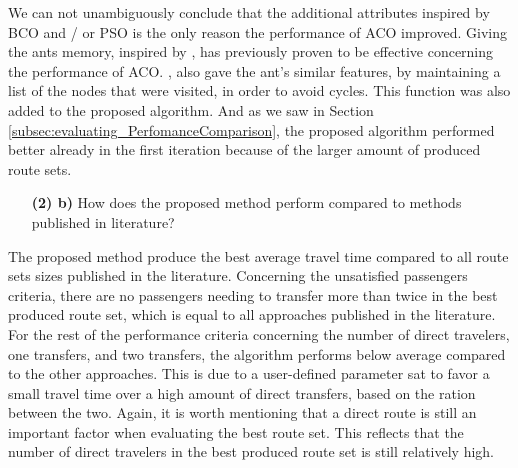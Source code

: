 We can not unambiguously conclude that the additional attributes inspired by BCO and / or PSO is the only reason the performance of ACO improved. Giving the ants memory, inspired by \citet{dorigo96}, has previously proven to be effective concerning the performance of ACO. \citet{sedighpour14}, \citet{poorzahedy11} \citet{salehinejad10} also gave the ant's similar features, by maintaining a list of the nodes that were visited, in order to avoid cycles. This function was also added to the proposed algorithm. And as we saw in Section \vref{subsec:evaluating_PerfomanceComparison}, the proposed algorithm performed better already in the first iteration because of the larger amount of produced route sets.

\begin{itemize}
\item[\textbf{(2) b)}] How does the proposed method perform compared to methods published in literature?
\end{itemize}

The proposed method produce the best average travel time compared to all route sets sizes published in the literature. Concerning the unsatisfied passengers criteria, there are no passengers needing to transfer more than twice in the best produced route set, which is equal to all approaches published in the literature. For the rest of the performance criteria concerning the number of direct travelers, one transfers, and two transfers, the algorithm performs below average compared to the other approaches. This is due to a user-defined parameter sat to favor a small travel time over a high amount of direct transfers, based on the ration between the two. Again, it is worth mentioning that a direct route is still an important factor when evaluating the best route set. This reflects that the number of direct travelers in the best produced route set is still relatively high.


